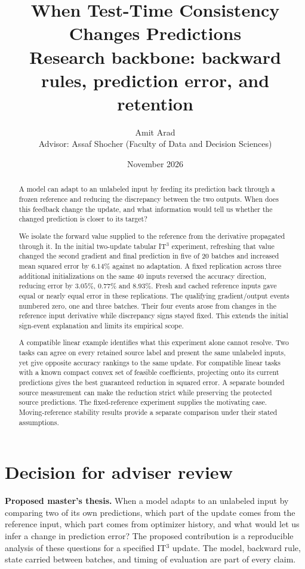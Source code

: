 \documentclass[11pt,a4paper]{article}
\title{When Test-Time Consistency Changes Predictions\\[0.4em]
\large Research backbone: backward rules, prediction error, and retention}
\author{Amit Arad\\[0.3em]
\small Advisor: Assaf Shocher (Faculty of Data and Decision Sciences)}
\date{November 2026}
\begin{document}
\maketitle
\begin{abstract}
A model can adapt to an unlabeled input by feeding its prediction back
through a frozen reference and reducing the discrepancy between the two
outputs. When does this feedback change the update, and what information
would tell us whether the changed prediction is closer to its target?

We isolate the forward value supplied to the reference from the derivative
propagated through it. In the initial two-update tabular IT$^3$ experiment,
refreshing that value changed the second gradient and final prediction
in five of 20 batches and increased mean squared error by $6.14\%$
against no adaptation. A fixed replication across three additional
initializations on the same 40 inputs reversed the accuracy direction,
reducing error by $3.05\%$, $0.77\%$ and $8.93\%$. Fresh and cached
reference inputs gave equal or nearly equal error in these replications.
The qualifying gradient/output events numbered zero, one and three
batches. Their four events arose from changes in the reference input
derivative while discrepancy signs stayed fixed. This extends the
initial sign-event explanation and limits its empirical scope.

A compatible linear example identifies what this experiment alone cannot
resolve. Two tasks can agree on every retained source label and present
the same unlabeled inputs, yet give opposite accuracy rankings to the
same update. For compatible linear tasks with a known compact convex set of feasible
coefficients, projecting onto its current predictions gives the best
guaranteed reduction in squared error. A separate bounded source
measurement can make the reduction strict while preserving the protected
source predictions. The fixed-reference
experiment supplies the motivating case. Moving-reference stability
results provide a separate comparison under their stated assumptions.
\end{abstract}

\section{Decision for adviser review}
\textbf{Proposed master's thesis.} When a model adapts to an unlabeled
input by comparing two of its own predictions, which part of the update
comes from the reference input, which part comes from optimizer history,
and what would let us infer a change in prediction error? The proposed
contribution is a reproducible analysis of these questions for a specified
IT$^3$ update. The model, backward rule, state carried between batches,
and timing of evaluation are part of every claim.
\end{document}
